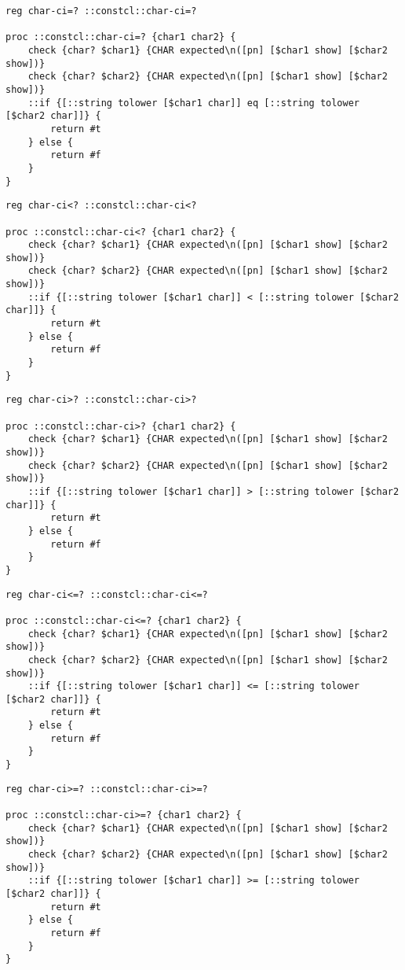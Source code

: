 \documentclass{report}
\begin{document}
\noindent\makebox[\linewidth]{\rule{\linewidth}{0.4pt}}
\begin{lstlisting}
reg char-ci=? ::constcl::char-ci=?
 
proc ::constcl::char-ci=? {char1 char2} {
    check {char? $char1} {CHAR expected\n([pn] [$char1 show] [$char2 show])}
    check {char? $char2} {CHAR expected\n([pn] [$char1 show] [$char2 show])}
    ::if {[::string tolower [$char1 char]] eq [::string tolower [$char2 char]]} {
        return #t
    } else {
        return #f
    }
}
\end{lstlisting}
\noindent\makebox[\linewidth]{\rule{\linewidth}{0.4pt}}
\noindent\makebox[\linewidth]{\rule{\linewidth}{0.4pt}}
\begin{lstlisting}
reg char-ci<? ::constcl::char-ci<?
 
proc ::constcl::char-ci<? {char1 char2} {
    check {char? $char1} {CHAR expected\n([pn] [$char1 show] [$char2 show])}
    check {char? $char2} {CHAR expected\n([pn] [$char1 show] [$char2 show])}
    ::if {[::string tolower [$char1 char]] < [::string tolower [$char2 char]]} {
        return #t
    } else {
        return #f
    }
}
\end{lstlisting}
\noindent\makebox[\linewidth]{\rule{\linewidth}{0.4pt}}
\noindent\makebox[\linewidth]{\rule{\linewidth}{0.4pt}}
\begin{lstlisting}
reg char-ci>? ::constcl::char-ci>?
 
proc ::constcl::char-ci>? {char1 char2} {
    check {char? $char1} {CHAR expected\n([pn] [$char1 show] [$char2 show])}
    check {char? $char2} {CHAR expected\n([pn] [$char1 show] [$char2 show])}
    ::if {[::string tolower [$char1 char]] > [::string tolower [$char2 char]]} {
        return #t
    } else {
        return #f
    }
}
\end{lstlisting}
\noindent\makebox[\linewidth]{\rule{\linewidth}{0.4pt}}
\noindent\makebox[\linewidth]{\rule{\linewidth}{0.4pt}}
\begin{lstlisting}
reg char-ci<=? ::constcl::char-ci<=?
 
proc ::constcl::char-ci<=? {char1 char2} {
    check {char? $char1} {CHAR expected\n([pn] [$char1 show] [$char2 show])}
    check {char? $char2} {CHAR expected\n([pn] [$char1 show] [$char2 show])}
    ::if {[::string tolower [$char1 char]] <= [::string tolower [$char2 char]]} {
        return #t
    } else {
        return #f
    }
}
\end{lstlisting}
\noindent\makebox[\linewidth]{\rule{\linewidth}{0.4pt}}
\noindent\makebox[\linewidth]{\rule{\linewidth}{0.4pt}}
\begin{lstlisting}
reg char-ci>=? ::constcl::char-ci>=?
 
proc ::constcl::char-ci>=? {char1 char2} {
    check {char? $char1} {CHAR expected\n([pn] [$char1 show] [$char2 show])}
    check {char? $char2} {CHAR expected\n([pn] [$char1 show] [$char2 show])}
    ::if {[::string tolower [$char1 char]] >= [::string tolower [$char2 char]]} {
        return #t
    } else {
        return #f
    }
}
\end{lstlisting}
\noindent\makebox[\linewidth]{\rule{\linewidth}{0.4pt}}
\end{document}

